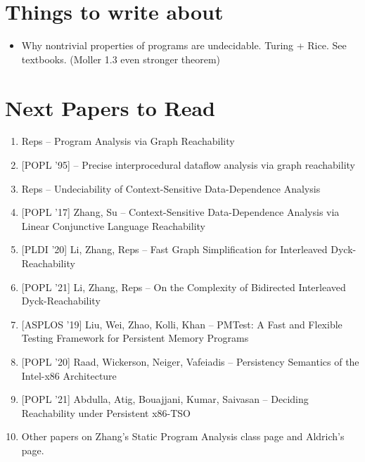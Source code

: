 \documentclass[11pt]{article}
\begin{document}
\section{Things to write about}
\begin{itemize}
  \item Why nontrivial properties of programs are undecidable. Turing + Rice. See textbooks. (Moller 1.3 even stronger theorem)
\end{itemize}

\section{Next Papers to Read}
\begin{enumerate}
  \item Reps -- Program Analysis via Graph Reachability
  \item {}[POPL '95] -- Precise interprocedural dataflow analysis via graph reachability
  \item Reps -- Undeciability of Context-Sensitive Data-Dependence Analysis
  \item {}[POPL '17] Zhang, Su -- Context-Sensitive Data-Dependence Analysis via Linear Conjunctive Language Reachability
  \item {}[PLDI '20] Li, Zhang, Reps -- Fast Graph Simplification for Interleaved Dyck-Reachability
  \item {}[POPL '21] Li, Zhang, Reps -- On the Complexity of Bidirected Interleaved Dyck-Reachability
  \item {}[ASPLOS '19] Liu, Wei, Zhao, Kolli, Khan -- PMTest: A Fast and Flexible Testing Framework for Persistent Memory Programs
  \item {}[POPL '20] Raad, Wickerson, Neiger, Vafeiadis -- Persistency Semantics of the Intel-x86 Architecture
  \item {}[POPL '21] Abdulla, Atig, Bouajjani, Kumar, Saivasan -- Deciding Reachability under Persistent x86-TSO
  \item Other papers on Zhang's Static Program Analysis class page and Aldrich's page.
\end{enumerate}
\end{document}
